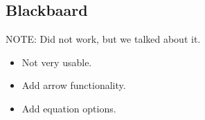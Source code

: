 \subsection*{Blackbaard}
NOTE: Did not work, but we talked about it.

\begin{itemize}
	\item Not very usable.
	\item Add arrow functionality.
	\item Add equation options.
\end{itemize}

\begin{comment}
\subsection*{Comments from the observers}
\begin{itemize}
	\item Task: It is possible to assign task to the supervisor, seems odd. --Kjakob09 09:19, 9 May 2012 (UTC)
	\item Task: Assign task to members form is not consistent with the rest of the system. (Eiler)
	\item Task: Overdue tasks should be marked with an ! (Eiler)
\end{itemize}
\end{comment}

